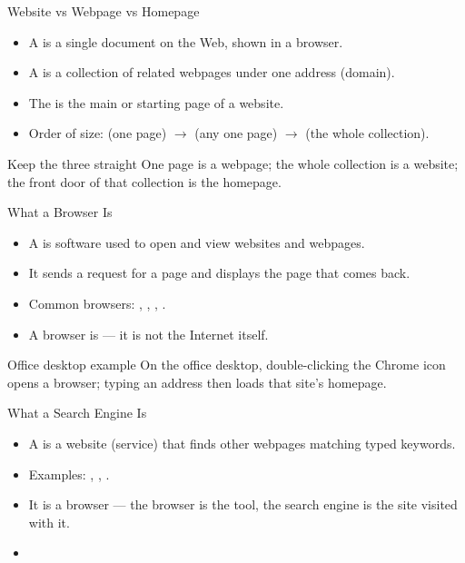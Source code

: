 \documentclass[aspectratio=169]{beamer}
\begin{document}
\begin{frame}{Website vs Webpage vs Homepage}
  \begin{itemize}
    \item A  is a single document on the Web, shown in a browser.
    \item A  is a collection of related webpages under one
      address (domain).
    \item The  is the main or starting page of a website.
    \item Order of size:  (one page) $\rightarrow$ 
      (any one page) $\rightarrow$  (the whole collection).
  \end{itemize}
  \begin{block}{Keep the three straight}
    One page is a webpage; the whole collection is a website; the front door
    of that collection is the homepage.
  \end{block}
\end{frame}

\begin{frame}{What a Browser Is}
  \begin{itemize}
    \item A  is software used to open and view websites and
      webpages.
    \item It sends a request for a page and displays the page that comes back.
    \item Common browsers: , ,
      , .
    \item A browser is  --- it is not the
      Internet itself.
  \end{itemize}
  \begin{block}{Office desktop example}
    On the office desktop, double-clicking the Chrome icon opens a browser;
    typing an address then loads that site's homepage.
  \end{block}
\end{frame}

\begin{frame}{What a Search Engine Is}
  \begin{itemize}
    \item A  is a website (service) that finds other
      webpages matching typed keywords.
    \item Examples: , , .
    \item It is  a browser --- the browser is the tool,
      the search engine is the site visited with it.
    \item {}
  \end{itemize}
\end{frame}
\end{document}
